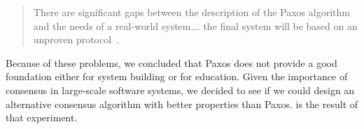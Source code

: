 {
\begin{quote}
There are significant gaps between the description of the Paxos
algorithm and the needs of a real-world system\dots. the final system
will be based on an unproven protocol~\cite{Chandra:2007}.
\end{quote}
}

Because of these problems, we concluded that Paxos does not provide
a good foundation either for system building or for education.
Given the importance of consensus in large-scale software
systems, we decided to see if we could design an alternative consensus
algorithm with better properties than Paxos.  \name{} is the result
of that experiment.


%

